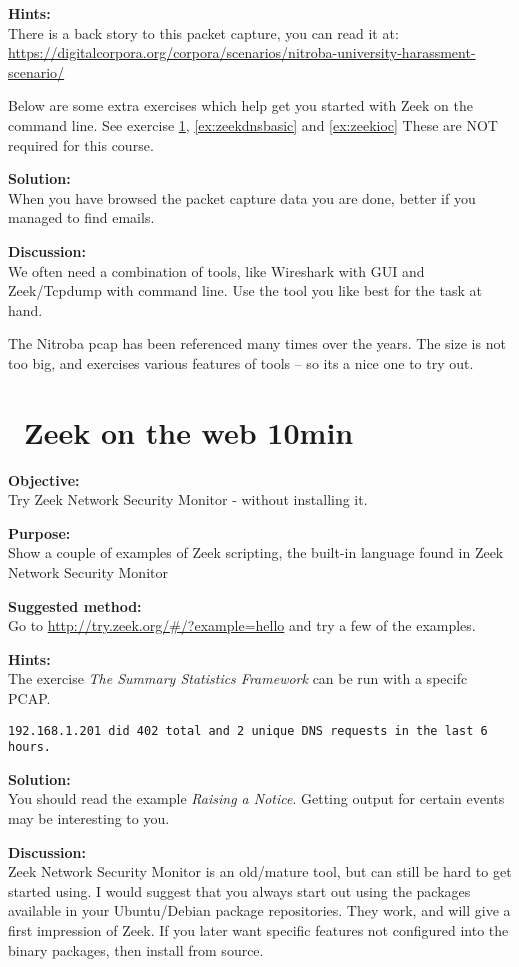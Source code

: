 \documentclass[a4paper,11pt,notitlepage]{report}
\begin{document}
{\bf Hints:}\\
There is a back story to this packet capture, you can read it at:\\
\url{https://digitalcorpora.org/corpora/scenarios/nitroba-university-harassment-scenario/}


Below are some extra exercises which help get you started with Zeek on the command line.
See exercise \ref{ex:zeekweb}, \ref{ex:zeekdnsbasic} and \ref{ex:zeekioc} These are NOT required for this course.

{\bf Solution:}\\
When you have browsed the packet capture data you are done, better if you managed to find emails.

{\bf Discussion:}\\
We often need a combination of tools, like Wireshark with GUI and Zeek/Tcpdump with command line. Use the tool you like best for the task at hand.

The Nitroba pcap has been referenced many times over the years. The size is not too big, and exercises various features of tools -- so its a nice one to try out.




\chapter{\faInfoCircle\ Zeek on the web 10min}
\label{ex:zeekweb}


{\bf Objective:} \\
Try Zeek Network Security Monitor - without installing it.


{\bf Purpose:}\\
Show a couple of examples of Zeek scripting, the built-in language found in Zeek Network Security Monitor


{\bf Suggested method:}\\
Go to \url{http://try.zeek.org/#/?example=hello} and try a few of the examples.

{\bf Hints:}\\
The exercise
\emph{The Summary Statistics Framework} can be run with a specifc PCAP.

\verb+192.168.1.201 did 402 total and 2 unique DNS requests in the last 6 hours.+

{\bf Solution:}\\
You should read the example \emph{Raising a Notice}. Getting output for certain events may be interesting to you.


{\bf Discussion:}\\
Zeek Network Security Monitor is an old/mature tool, but can still be hard to get started using. I would suggest that you always start out using the packages available in your Ubuntu/Debian package repositories.  They work, and will give a first impression of Zeek. If you later want specific features not configured into the binary packages, then install from source.
\end{document}
